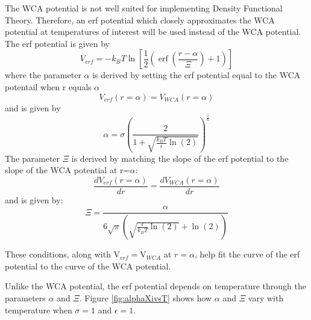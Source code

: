\documentclass[12pt]{article}
\begin{document}
The WCA potential is not well suited for implementing Density Functional Theory.  Therefore, an erf potential which closely approximates the WCA potential at temperatures of interest will be used instead of the WCA potential. The erf potential is given by 
\begin{equation}
	{V_{erf}=-k_BT\ln\left[\frac{1}{2}\left(\operatorname{erf}\left(\frac{r-\alpha}{\Xi}\right)+1\right)\right]}
\end{equation} 
where the parameter $\alpha$ is derived by setting the erf potential equal to the WCA potentail when r equals $\alpha$ 
\begin{displaymath}{V_{erf}(r=\alpha)=V_{WCA}(r=\alpha)}\end{displaymath} 
and is given by 
\begin{equation}\label{alphaT}
	{\alpha=\sigma\left(\frac{2}{1+\sqrt{\frac{k_BT}{\epsilon}\ln(2)}}\right)^\frac{1}{6}}
\end{equation} 
The parameter $\Xi$ is derived by matching the slope of the erf potential to the slope of the WCA potential at r=$\alpha$:
\begin{displaymath}{\frac{dV_{erf}(r=\alpha)}{dr}=\frac{dV_{WCA}(r=\alpha)}{dr}}\end{displaymath} 
and is given by: 
\begin{equation}
	{\Xi=\frac{\alpha}{6\sqrt{\pi}\left(\sqrt{\frac{\epsilon}{k_BT}\ln(2)}+\ln(2)\right)}}
\end{equation} 

\noindent These conditions, along with V$_{erf}=$V$_{WCA}$ at $r=\alpha$, help fit the curve of the erf potential to the curve of the WCA potential.

Unlike the WCA potential, the erf potential depends on temperature through the parameters $\alpha$ and $\Xi$. Figure \ref{fig:alphaXivsT} shows how $\alpha$ and $\Xi$ vary with temperature when $\sigma=1$ and $\epsilon=1$. %
\end{document}
